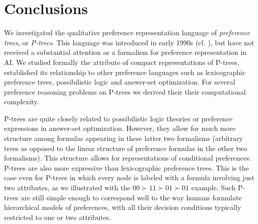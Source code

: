 %
%


\section{Conclusions}

We investigated the qualitative preference representation language of 
\textit{preference trees}, or \textit{P-trees}. This language was 
introduced in early 1990s (cf. \cite{fraser1993,fraser1994}), but have 
not received a substantial attention as a formalism for preference 
representation in AI. We studied formally the attribute of compact 
representations of
P-trees, established its relationship to other preference languages
such as lexicographic preference trees, possibilistic logic and
answer-set optimization. For several preference reasoning problems 
on P-trees we derived their their computational complexity.

P-trees are quite closely related to possibilistic logic theories or
preference expressions in answer-set optimization. However, they allow
for much more structure among formulas appearing in these latter two
formalisms (arbitrary trees as opposed to the linear structure of 
preference formulas in the other two formalisms). This structure allows 
for representations of conditional preferences. P-trees are also more
expressive than lexicographic preference trees. This is the case even 
for P-trees in which every node is labeled with a formula involving just
two attributes, as we illustrated with the $00\succ 11\succ 01\succ 01$ 
example. Such P-trees are still simple enough to correspond well to
the way humans formulate hierarchical models of preferences, with all
their decision conditions typically restricted to one or two attributes. 

